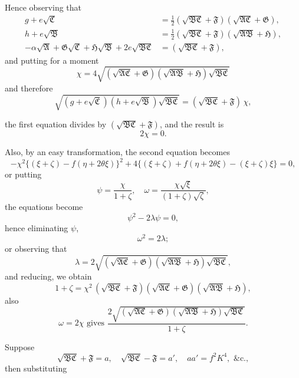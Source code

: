 \documentclass[11pt]{article}
\begin{document}
Hence observing that
\begin{align*}
g+e\sqrt{\mathfrak{C}} &= \tfrac{1}{2}(\sqrt{\mathfrak{B}\mathfrak{C}}+\mathfrak{F})(\sqrt{\mathfrak{A}\mathfrak{C}}+\mathfrak{G}),\\
h+e\sqrt{\mathfrak{B}} &= \tfrac{1}{2}(\sqrt{\mathfrak{B}\mathfrak{C}}+\mathfrak{F})(\sqrt{\mathfrak{A}\mathfrak{B}}+\mathfrak{H}),\\
-\alpha\sqrt{\mathfrak{A}}+\mathfrak{G}\sqrt{\mathfrak{C}}+\mathfrak{H}\sqrt{\mathfrak{B}}+2e\sqrt{\mathfrak{B}\mathfrak{C}} &= (\sqrt{\mathfrak{B}\mathfrak{C}}+\mathfrak{F}),
\end{align*}
and putting for a moment
\[
\chi = 4\sqrt{(\sqrt{\mathfrak{A}\mathfrak{C}}+\mathfrak{G})(\sqrt{\mathfrak{A}\mathfrak{B}}+\mathfrak{H})\sqrt{\mathfrak{B}\mathfrak{C}}}
\]
and therefore
\[
\sqrt{(g+e\sqrt{\mathfrak{C}})(h+e\sqrt{\mathfrak{B}})\sqrt{\mathfrak{B}\mathfrak{C}}} = (\sqrt{\mathfrak{B}\mathfrak{C}}+\mathfrak{F})\,\chi,
\]

\newpage
\setcounter{page}{74}

the first equation divides by $(\sqrt{\mathfrak{B}\mathfrak{C}}+\mathfrak{F})$, and the result is
\[
2\chi = 0.
\]

Also, by an easy transformation, the second equation becomes
\[
-\chi^2\{(\xi+\zeta)-f(\eta+2\theta\xi)\}^2 + 4\{(\xi+\zeta)+f(\eta+2\theta\xi)-(\xi+\zeta)\xi\} = 0,
\]
or putting
\[
\psi = \frac{\chi}{1+\zeta}, \quad \omega = \frac{\chi\sqrt{\xi}}{(1+\zeta)\sqrt{\zeta}},
\]
the equations become
\[
\psi^2 - 2\lambda\psi = 0,
\]
hence eliminating $\psi$,
\[
\omega^2 = 2\lambda;
\]
or observing that
\[
\lambda = 2\sqrt{(\sqrt{\mathfrak{A}\mathfrak{C}}+\mathfrak{G})(\sqrt{\mathfrak{A}\mathfrak{B}}+\mathfrak{H})\sqrt{\mathfrak{B}\mathfrak{C}}},
\]
and reducing, we obtain
\[
1+\zeta = \chi^2\,(\sqrt{\mathfrak{B}\mathfrak{C}}+\mathfrak{F})(\sqrt{\mathfrak{A}\mathfrak{C}}+\mathfrak{G})(\sqrt{\mathfrak{A}\mathfrak{B}}+\mathfrak{H}),
\]
also
\[
\omega = 2\chi \text{ gives } \frac{2\sqrt{(\sqrt{\mathfrak{A}\mathfrak{C}}+\mathfrak{G})(\sqrt{\mathfrak{A}\mathfrak{B}}+\mathfrak{H})\sqrt{\mathfrak{B}\mathfrak{C}}}}{1+\zeta}.
\]

Suppose
\[
\sqrt{\mathfrak{B}\mathfrak{C}}+\mathfrak{F} = a, \quad \sqrt{\mathfrak{B}\mathfrak{C}}-\mathfrak{F} = a', \quad aa' = f^2K^4, \text{ \&c.},
\]
then substituting

\newpage
\setcounter{page}{75}
\end{document}
